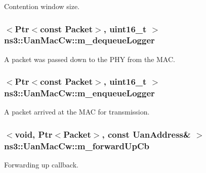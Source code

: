 Contention window size. 

\subsubsection[{\texorpdfstring{m\+\_\+dequeue\+Logger}{m_dequeueLogger}}]{$<${\bf Ptr}$<$const {\bf Packet}$>$, uint16\+\_\+t $>$ ns3\+::\+Uan\+Mac\+Cw\+::m\+\_\+dequeue\+Logger\hspace{0.3cm}{\ttfamily [private]}}\hypertarget{classns3_1_1UanMacCw_ae4e44147f4b565d509706be9cb9b4408}{}\label{classns3_1_1UanMacCw_ae4e44147f4b565d509706be9cb9b4408}
A packet was passed down to the P\+HY from the M\+AC. 
\subsubsection[{\texorpdfstring{m\+\_\+enqueue\+Logger}{m_enqueueLogger}}]{$<${\bf Ptr}$<$const {\bf Packet}$>$, uint16\+\_\+t $>$ ns3\+::\+Uan\+Mac\+Cw\+::m\+\_\+enqueue\+Logger\hspace{0.3cm}{\ttfamily [private]}}\hypertarget{classns3_1_1UanMacCw_a16aefbcad66a139dd720b556aa3deb61}{}\label{classns3_1_1UanMacCw_a16aefbcad66a139dd720b556aa3deb61}
A packet arrived at the M\+AC for transmission. 
\subsubsection[{\texorpdfstring{m\+\_\+forward\+Up\+Cb}{m_forwardUpCb}}]{$<$void, {\bf Ptr}$<${\bf Packet}$>$, const {\bf Uan\+Address}\& $>$ ns3\+::\+Uan\+Mac\+Cw\+::m\+\_\+forward\+Up\+Cb\hspace{0.3cm}{\ttfamily [private]}}\hypertarget{classns3_1_1UanMacCw_abf0c52816b6b6dc01c6760a4d9393a34}{}\label{classns3_1_1UanMacCw_abf0c52816b6b6dc01c6760a4d9393a34}
Forwarding up callback. 
